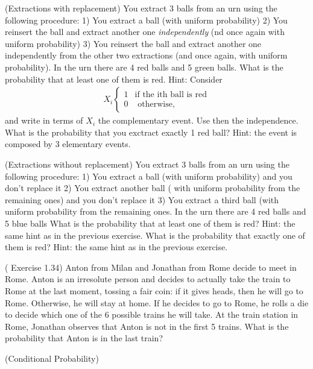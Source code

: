 \documentclass[12pt]{article}
\newcommand{\<}{{\langle \!\! \langle}}
\renewcommand{\>}{{\rangle \!\! \rangle}}
\newcommand{\bel}[2]{\begin{equation} \label{#1} \begin{split} #2
 					\end{split} \end{equation}}
\begin{document}
\begin{ExerciseList}
	\Exercise (Extractions with replacement) You extract 3 balls from an urn using the following procedure: 1) You extract a ball (with uniform probability) 2) You reinsert the ball and extract another one \emph{independently} (nd once again with uniform probability)  3) You reinsert the ball and extract another one independently from the other two extractions (and once again, with uniform probability). In the urn there are 4 red balls and 5 green balls.
	\Question What is the probability that at least one of them is red. Hint: Consider 
	\bel{d:Xi}{ X_i \begin{cases} 1 & \textrm{if the ith ball is red} \\
	            0 & \textrm{ otherwise,}
	\end{cases}}
	and write in terms of $X_i$ the complementary event. Use then the independence. 
	\Question What is the probability that you exctract exactly 1 red ball? Hint: the event is composed by 3 elementary events.
	
	\Exercise (Extractions without replacement) You extract 3 balls from an urn using the following procedure: 1) You extract a ball (with uniform probability) and you don't replace it 2) You extract another ball ( with uniform probability from the remaining ones) and you don't replace it 3) You extract a third  ball (with uniform probability from the remaining ones. In the urn there are 4 red balls and 5 blue balls
	\Question What is the probability that at least one of them is red? Hint: the same hint as in the previous exercise.
	\Question What is the probability that exactly one of them is red? Hint: the same hint as in the previous exercise. 

	\Exercise (\cite{daipra} Exercise 1.34) Anton from Milan and Jonathan from Rome decide to meet in Rome. Anton is an irresolute person and decides to actually take the train to Rome at the last moment, tossing a fair coin: if it gives heads, then he will go to Rome. Otherwise, he will stay at home. If he decides to go to Rome, he rolls a die to decide which one of the 6 possible trains he will take. At the train station in Rome, Jonathan observes that Anton is not in the first 5 trains. What is the probability that Anton is in the last train?   

	\Exercise  (Conditional Probability) 


\end{ExerciseList}
\end{document}
